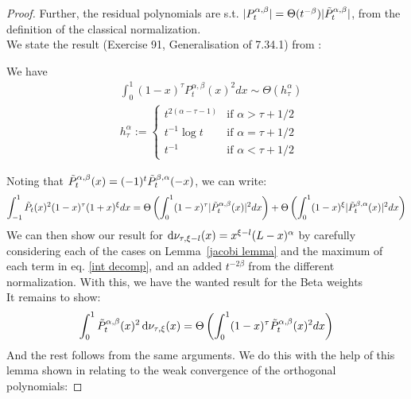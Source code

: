 \documentclass{article}
\begin{document}
\begin{proof}
Further, the residual polynomials  are s.t. $|P^{\alpha,\beta}_t|=\Theta(t^{-\beta})|\Tilde{P}^{\alpha,\beta}_t|$, from the definition of the classical normalization.\\
We state the result (Exercise 91, Generalisation of 7.34.1) from \cite{szego1975orthogonal}:
\begin{lemma}
We have
\begin{align}
    &\int_0^1(1-x)^\tau P_t^{\alpha,\beta}(x)^2dx \sim\Theta( h_{\tau}^\alpha) \\
    &h_{\tau}^\alpha:=
\left\{
	\begin{array}{ll}
		t^{2(\alpha-\tau-1)}  & \mbox{if } \alpha>\tau+1/2 \\
		t^{-1}\log t   & \mbox{if } \alpha=\tau+1/2 \\
		t^{-1}   & \mbox{if } \alpha<\tau+1/2
	\end{array}
\right.
\end{align}
 \label{jacobi lemma}
\end{lemma}
Noting that $\Tilde{P}^{\alpha,\beta}_t(x)=(-1)^t\Tilde{P}_t^{\beta,\alpha}(-x)$, we can write:
\begin{equation}
    \int_{-1}^1\Tilde{P}_t(x)^2(1-x)^\tau(1+x)^\xi dx = \Theta\left(\int_0^1(1-x)^\tau|\Tilde{P}_t^{\alpha,\beta}(x)|^2dx\right) +\Theta\left(\int_0^1(1-x)^\xi|\Tilde{P}_t^{\beta,\alpha}(x)|^2dx\right) \label{int decomp}
\end{equation}
We can then show our result for $\mathop{}\!\mathrm{d}\nu_{\tau,\xi-l}(x)=x^{\xi-l}(L-x)^\alpha$ by carefully considering each of the cases on Lemma~\ref{jacobi lemma} and the maximum of each term in eq. \ref{int decomp}, and an added $t^{-2\beta}$ from the different normalization. With this, we have the wanted result for the Beta weights \\
It remains to show:
\begin{equation}
    \int_0^1 \Tilde{P}_t^{\alpha,\beta}(x)^2\mathop{}\!\mathrm{d}\nu_{\tau,\xi}(x)= \Theta\left(\int_0^1(1-x)^\tau\Tilde{P}_t^{\alpha,\beta}(x)^2dx \right)
\end{equation}
And the rest follows from the same arguments. We do this with the help of this lemma shown in \cite{van1995weak} relating to the weak convergence of the orthogonal polynomials:


\end{proof}
\end{document}

